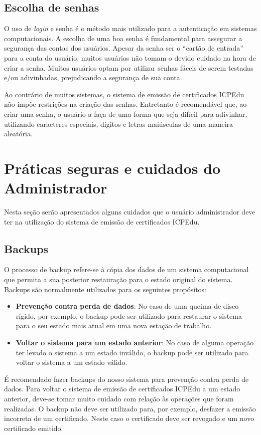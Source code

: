 \subsection{Escolha de senhas}

O uso de \textit{login} e senha é o método mais utilizado para a autenticação em sistemas computacionais. A escolha de uma boa senha é fundamental para assegurar a segurança das contas dos usuários.
Apesar da senha ser o ``cartão de entrada'' para a conta do usuário, muitos usuários não tomam o devido cuidado na hora de criar a senha.
Muitos usuários optam por utilizar senhas fáceis de serem testadas e/ou adivinhadas, prejudicando a segurança de sua conta.

Ao contrário de muitos sistemas, o sistema de emissão de certificados ICPEdu não impõe restrições na criação das senhas. Entretanto é recomendável que, ao criar uma senha, o usuário a faça  de uma forma que seja difícil para adivinhar, utilizando caracteres especiais, dígitos e letras maiúsculas de uma maneira aleatória.

\section{Práticas seguras e cuidados do Administrador}

Nesta seção serão apresentados alguns cuidados que o usuário administrador deve ter na utilização do sistema de emissão de certificados ICPEdu.


\subsection{Backups}

O processo de backup refere-se à cópia dos dados de um sistema computacional que permita a sua posterior restauração para o estado original do sistema. Backups são normalmente utilizados para os seguintes propósitos:

\begin{itemize}
 \item \textbf{Prevenção contra perda de dados}: No caso de uma queima de disco rígido, por exemplo, o backup pode ser utilizado para restaurar o sistema para o seu estado mais atual em uma nova estação de trabalho. 
 \item \textbf{Voltar o sistema para um estado anterior}: No caso de alguma operação ter levado o sistema a um estado inválido, o backup pode ser utilizado para voltar o sistema a um estado válido.
\end{itemize}

É recomendado fazer backups do nosso sistema para prevenção contra perda de dados. Para voltar o sistema de emissão de certificados ICPEdu a um estado anterior, deve-se tomar muito cuidado com relação às operações que foram realizadas.
O backup não deve ser utilizado para, por exemplo, desfazer a emissão incorreta de um certificado. Neste caso o certificado deve ser revogado e um novo certificado emitido.

